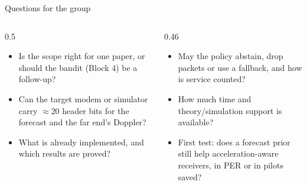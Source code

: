 \documentclass[aspectratio=169,11pt]{beamer}
\begin{document}
\begin{frame}{Questions for the group}
\begin{columns}[T]
\begin{column}{0.5\textwidth}
\small
\begin{itemize}
\item Is the scope right for one paper, or should the bandit (Block 4) be a follow-up?
\item Can the target modem or simulator carry $\approx$20 header bits for the forecast and the far end's Doppler?
\item What is already implemented, and which results are proved?
\end{itemize}
\end{column}
\begin{column}{0.46\textwidth}
\small
\begin{itemize}
\item May the policy abstain, drop packets or use a fallback, and how is service counted?
\item How much time and theory/simulation support is available?
\item First test: does a forecast prior still help acceleration-aware receivers, in PER or in pilots saved?
\end{itemize}
\end{column}
\end{columns}
\end{frame}
\end{document}
